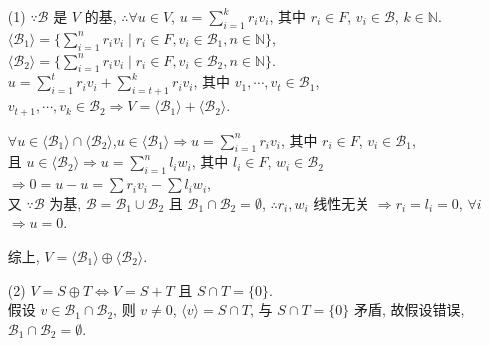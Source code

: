 \documentclass{note}
\begin{document}
\begin{pf}
    \begin{itemize}
        \item[(1)] $\because\mathcal{B}$ 是 $V$ 的基, $\therefore\forall u\in V$, $u=\sum_{i=1}^kr_iv_i$, 其中 $r_i\in F$, $v_i\in\mathcal{B}$, $k\in\mathbb{N}$.\\
        $\langle\mathcal{B}_1\rangle=\{\sum_{i=1}^nr_iv_i\mid r_i\in F,v_i\in\mathcal{B}_1,n\in\mathbb{N}\}$, $\langle\mathcal{B}_2\rangle=\{\sum_{i=1}^nr_iv_i\mid r_i\in F,v_i\in\mathcal{B}_2,n\in\mathbb{N}\}$.\\
        $u=\sum_{i=1}^tr_iv_i+\sum_{i=t+1}^kr_iv_i$, 其中 $v_1,\cdots,v_t\in\mathcal{B}_1$, $v_{t+1},\cdots,v_k\in\mathcal{B}_2\Longrightarrow V=\langle\mathcal{B}_1\rangle+\langle\mathcal{B}_2\rangle$.

        $\forall u\in\langle\mathcal{B}_1\rangle\cap\langle\mathcal{B}_2\rangle$,$u\in\langle\mathcal{B}_1\rangle\Longrightarrow u=\sum_{i=1}^nr_iv_i$, 其中 $r_i\in F$, $v_i\in\mathcal{B}_1$,\\
        且 $u\in\langle\mathcal{B}_2\rangle\Longrightarrow u=\sum_{i=1}^nl_iw_i$, 其中 $l_i\in F$, $w_i\in\mathcal{B}_2$\\
        $\Longrightarrow 0=u-u=\sum r_iv_i-\sum l_iw_i$,\\
        又 $\because\mathcal{B}$ 为基, $\mathcal{B}=\mathcal{B}_1\cup\mathcal{B}_2$ 且 $\mathcal{B}_1\cap\mathcal{B}_2=\emptyset$, $\therefore r_i,w_i$ 线性无关 $\Longrightarrow r_i=l_i=0$, $\forall i$\\
        $\Longrightarrow u=0$.

        综上, $V=\langle\mathcal{B}_1\rangle\oplus\langle\mathcal{B}_2\rangle$.
        \item[(2)] $V=S\oplus T\Longleftrightarrow V=S+T$ 且 $S\cap T=\{0\}$.\\
        假设 $v\in\mathcal{B}_1\cap\mathcal{B}_2$, 则 $v\neq 0$, $\langle v\rangle=S\cap T$, 与 $S\cap T=\{0\}$ 矛盾, 故假设错误, $\mathcal{B}_1\cap\mathcal{B}_2=\emptyset$.


\end{itemize}
\end{pf}
\end{document}
